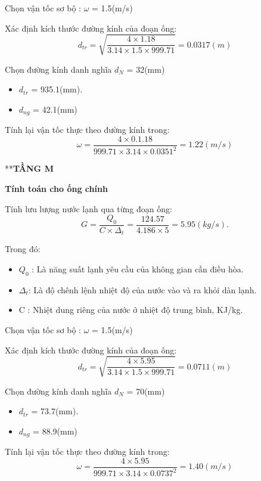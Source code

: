 Chọn vận tốc sơ bộ : $\omega$ = 1.5(m/s)

Xác định kích thước đường kính của đoạn ống:
\begin{equation*}
	d_{tr} = \sqrt{\dfrac{4 \times 1.18}{3.14 \times 1.5 \times 999.71}} = 0.0317(m)
\end{equation*}

Chọn đường kính danh nghĩa $d_{N}$ = 32(mm)
\begin{itemize}
	\item $d_{tr}$ = 935.1(mm).
	\item $d_{ng}$ = 42.1(mm)
\end{itemize}

Tính lại vận tốc thực theo đường kính trong:
\begin{equation*}
	\omega = \dfrac{4 \times 0.1.18 }{999.71 \times 3.14 \times 0.0351^{2}} = 1.22(m/s)
\end{equation*}

**\textbf{TẦNG M}

\textbf{Tính toán cho ống chính}

Tính lưu lượng nước lạnh qua từng đoạn ống:
\begin{equation*}
	G = \dfrac{Q_{0}}{C \times \Delta_{t}} =\dfrac{124.57}{4.186 \times 5} = 5.95(kg/s).
\end{equation*}

Trong đó:
\begin{itemize}
	\item $Q_{0}$ : Là năng suất lạnh yêu cầu của không gian cần điều hòa.
	\item $\Delta_{t}$: Là độ chênh lệnh nhiệt độ của nước vào và ra khỏi dàn lạnh.
	\item C : Nhiệt dung riêng của nước ở nhiệt độ trung bình, KJ/kg.
\end{itemize}

Chọn vận tốc sơ bộ : $\omega$ = 1.5(m/s)

Xác định kích thước đường kính của đoạn ống:
\begin{equation*}
	d_{tr} = \sqrt{\dfrac{4 \times 5.95}{3.14 \times 1.5 \times 999.71}} = 0.0711(m)
\end{equation*}

Chọn đường kính danh nghĩa $d_{N}$ = 70(mm)
\begin{itemize}
	\item $d_{tr}$ = 73.7(mm).
	\item $d_{ng}$ = 88.9(mm)
\end{itemize}

Tính lại vận tốc thực theo đường kính trong:
\begin{equation*}
	\omega = \dfrac{4 \times 5.95 }{999.71 \times 3.14 \times 0.0737^{2}} = 1.40(m/s)
\end{equation*}

